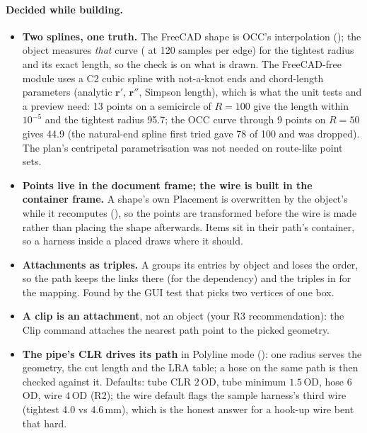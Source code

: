 \paragraph{Decided while building.}
\begin{itemize}[nosep]
  \item \textbf{Two splines, one truth.} The FreeCAD shape is OCC's interpolation ();
        the object measures \emph{that} curve ( at 120 samples per edge) for the tightest
        radius and its exact length, so the check is on what is drawn. The FreeCAD-free module uses a C2 cubic spline
        with not-a-knot ends and chord-length parameters (analytic $\mathbf r'$, $\mathbf r''$, Simpson length), which
        is what the unit tests and a preview need: 13 points on a semicircle of $R=100$ give the length within
        $10^{-5}$ and the tightest radius 95.7; the OCC curve through 9 points on $R=50$ gives 44.9 (the natural-end
        spline first tried gave 78 of 100 and was dropped). The plan's centripetal parametrisation was not needed
        on route-like point sets.
  \item \textbf{Points live in the document frame; the wire is built in the container frame.} A shape's own
        Placement is overwritten by the object's while it recomputes (), so the
        points are transformed before the wire is made rather than placing the shape afterwards. Items sit in
        their path's container, so a harness inside a placed  draws where it should.
  \item \textbf{Attachments as triples.} A  groups its entries by object and loses the
        order, so the path keeps the links there (for the dependency) and the  triples in
         for the mapping. Found by the GUI test that picks two vertices of one box.
  \item \textbf{A clip is an attachment}, not an object (your R3 recommendation): the Clip command attaches the
        nearest path point to the picked geometry.
  \item \textbf{The pipe's CLR drives its path} in Polyline mode (): one radius serves the geometry,
        the cut length and the LRA table; a hose on the same path is then checked against it. Defaults: tube CLR
        $2\,$OD, tube minimum $1.5\,$OD, hose $6\,$OD, wire $4\,$OD (R2); the wire default flags the sample harness's
        third wire (tightest 4.0 vs 4.6\,mm), which is the honest answer for a hook-up wire bent that hard.

\end{itemize}
